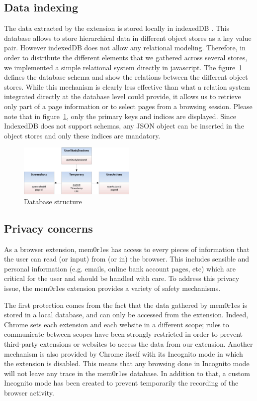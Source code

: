 \documentclass[10pt,a4paper]{article}
\begin{document}
\subsection{Data indexing}
\label{subsec:dataIndexing}
The data extracted by the extension is stored locally in indexedDB \cite{indexeddb}. This database allows to store hierarchical data in different object stores as a key value pair. However indexedDB does not allow any relational modeling. Therefore, in order to distribute the different elements that we gathered across several stores, we implemented a simple relational system directly in javascript. The figure~\ref{fig:database} defines the database schema and show the relations between the different object stores. While this mechanism is clearly less effective than what a relation system integrated directly at the database level could provide, it allows us to retrieve only part of a page information or to select pages from a browsing session. Please note that in figure~\ref{fig:database}, only the primary keys and indices are displayed. Since IndexedDB does not support schemas, any JSON object can be inserted in the object stores and only these indices are mandatory.
\begin{figure}[h!]
	\centerline{
		\includegraphics[width=0.5\textwidth]{figures/database.jpg}}
	\caption{ Database structure}
	\label{fig:database}
\end{figure}

\subsection{Privacy concerns}
As a browser extension, mem0r1es has access to every pieces of information that the user can read (or input) from (or in) the browser. This includes sensible and personal information (e.g. emails, online bank account pages, etc) which are critical for the user and should be handled with care. To address this privacy issue, the mem0r1es extension provides a variety of safety mechanisms.

The first protection comes from the fact that the data gathered by mem0r1es is stored in a local database, and can only be accessed from the extension. Indeed, Chrome sets each extension and each website in a different scope; rules to communicate between scopes have been strongly restricted in order to prevent third-party extensions or websites to access the data from our extension. Another mechanism is also provided by Chrome itself with its Incognito mode in which the extension is disabled. This means that any browsing done in Incognito mode will not leave any trace in the mem0r1es database. In addition to that, a custom Incognito mode has been created to prevent temporarily the recording of the browser activity.
\end{document}
